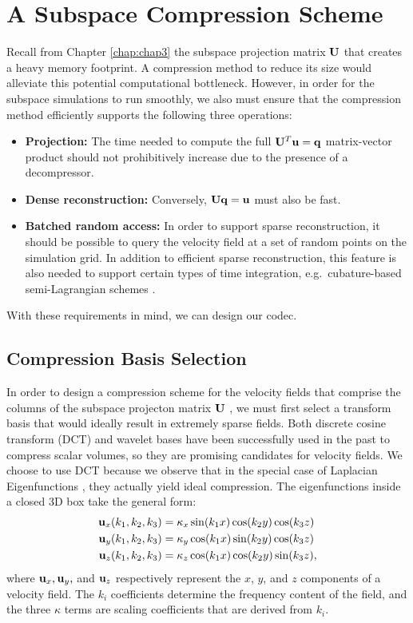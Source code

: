 \section{A Subspace Compression Scheme}
\label{sec:Algorithm}
Recall from Chapter \ref{chap:chap3} the subspace projection matrix $\mathbf{U}$ that creates a 
heavy memory footprint. A compression method to reduce its size would alleviate this potential computational bottleneck. However, in order for the subspace simulations to run smoothly, we also must ensure that the compression method efficiently supports the following
three operations:
\begin{itemize}
\item \textbf{Projection:} The time needed to compute the full $\mathbf{U}^T \mathbf{u} = \mathbf{q}$ matrix-vector product should not prohibitively increase due to the presence of a decompressor.
\item \textbf{Dense reconstruction:} Conversely, $\mathbf{U} \mathbf{q} = \mathbf{u}$ must also be fast.
\item \textbf{Batched random access:} In order to support sparse reconstruction, it should be possible to query the velocity field at a set of random points on the simulation grid. In addition to efficient sparse reconstruction, this feature is also needed to support certain types of time integration, e.g.~cubature-based semi-Lagrangian schemes \cite{Kim2013}.
\end{itemize}
With these requirements in mind, we can design our codec.
\subsection{Compression Basis Selection}
\label{sec:laplacian}
In order to design a compression scheme for the velocity fields that comprise the columns of the subspace projecton matrix $\mathbf{U}$ , we must first select a transform basis that would ideally result in extremely sparse fields. Both discrete cosine transform (DCT) \cite{Yeo:1995:VRD} and wavelet \cite{guthe2002,treib12turbulence} bases have been successfully used in the past to compress scalar volumes, so they are promising candidates for velocity fields. We choose to use DCT because we observe that in the special case of Laplacian Eigenfunctions \cite{deWitt:2012}, they actually yield ideal compression. The eigenfunctions inside a closed 3D box take the general form:
\begin{equation}
\begin{split}
\mathbf{u}_x(k_1,k_2,k_3) &= \kappa_x \sin(k_1 x) \cos(k_2 y) \cos(k_3 z) \\
\mathbf{u}_y(k_1,k_2,k_3) &= \kappa_y \cos(k_1 x) \sin(k_2 y) \cos(k_3 z) \\
\mathbf{u}_z(k_1,k_2,k_3) &= \kappa_z \cos(k_1 x) \cos(k_2 y) \sin(k_3 z),
\end{split}
\end{equation}
where $\mathbf{u}_x, \mathbf{u}_y,$ and $\mathbf{u}_z$ respectively represent the $x$, $y$, and $z$ components of a velocity field. The $k_i$ coefficients determine the frequency content of the field, and the three $\kappa$ terms are scaling coefficients that are derived from $k_i$.

